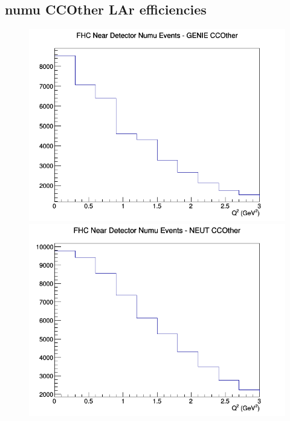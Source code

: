 \subsection{numu CCOther LAr efficiencies}
\begin{figure}[h]
\includegraphics[width=\linewidth]{eff_Q2/LAr/CCOther_FHC_ND_numu_Q2_GENIE.png}
\endminipage
{}
\includegraphics[width=\linewidth]{eff_Q2/LAr/CCOther_FHC_ND_numu_Q2_NEUT.png}
\endminipage
{}

\end{figure}
